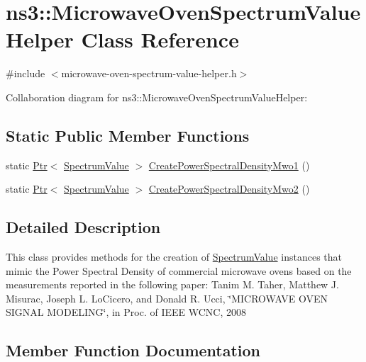 \hypertarget{classns3_1_1MicrowaveOvenSpectrumValueHelper}{}\section{ns3\+:\+:Microwave\+Oven\+Spectrum\+Value\+Helper Class Reference}
\label{classns3_1_1MicrowaveOvenSpectrumValueHelper}


{\ttfamily \#include $<$microwave-\/oven-\/spectrum-\/value-\/helper.\+h$>$}



Collaboration diagram for ns3\+:\+:Microwave\+Oven\+Spectrum\+Value\+Helper\+:
\subsection*{Static Public Member Functions}
\begin{DoxyCompactItemize}
\item 
static \hyperlink{classns3_1_1Ptr}{Ptr}$<$ \hyperlink{classns3_1_1SpectrumValue}{Spectrum\+Value} $>$ \hyperlink{classns3_1_1MicrowaveOvenSpectrumValueHelper_a5cba522060597c3e7855e72cea0de4b3}{Create\+Power\+Spectral\+Density\+Mwo1} ()
\item 
static \hyperlink{classns3_1_1Ptr}{Ptr}$<$ \hyperlink{classns3_1_1SpectrumValue}{Spectrum\+Value} $>$ \hyperlink{classns3_1_1MicrowaveOvenSpectrumValueHelper_a9debacfad323aa91cc8802bd244329df}{Create\+Power\+Spectral\+Density\+Mwo2} ()
\end{DoxyCompactItemize}


\subsection{Detailed Description}
This class provides methods for the creation of \hyperlink{classns3_1_1SpectrumValue}{Spectrum\+Value} instances that mimic the Power Spectral Density of commercial microwave ovens based on the measurements reported in the following paper\+: Tanim M. Taher, Matthew J. Misurac, Joseph L. Lo\+Cicero, and Donald R. Ucci, \char`\"{}\+M\+I\+C\+R\+O\+W\+A\+V\+E O\+V\+E\+N S\+I\+G\+N\+A\+L M\+O\+D\+E\+L\+I\+N\+G\char`\"{}, in Proc. of I\+E\+EE W\+C\+NC, 2008 

\subsection{Member Function Documentation}
